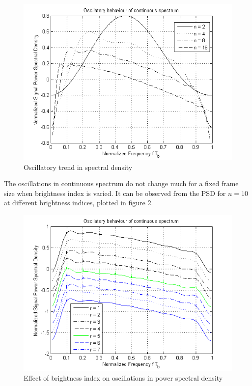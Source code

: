  \begin{figure}[!hbtp]
  \includegraphics[width=\figwidth]{./Figures/OscilationWithN.png}  
  \caption{Oscillatory trend in spectral density}
  \label {fig:OscilationWithN}
 \end{figure}

The oscillations in continuous spectrum do not change much for a fixed frame size when brightness index is varied. It can be observed from the PSD for $n=10$ at different brightness indices, plotted in figure \ref{fig:OscilationWithR}. 

 \begin{figure}[!hbtp]
  \includegraphics[width=\figwidth]{./Figures/OscilationWithR.png}  
  \caption[Effect of $B_I$ on oscilations in PSD]{Effect of brightness index on oscillations in power spectral density}
  \label {fig:OscilationWithR}
 \end{figure}


%

